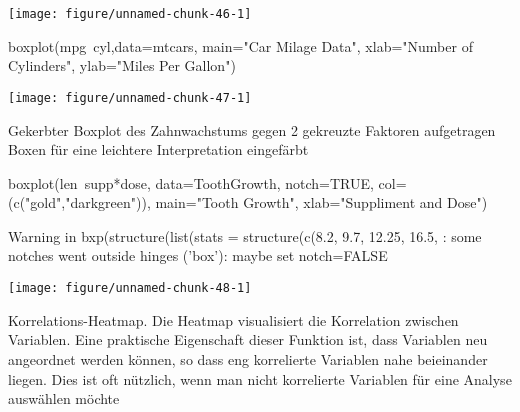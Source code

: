 \documentclass[a4paper,twoside]{tufte-book}\usepackage[]{graphicx}\usepackage[]{color}
\makeatletter
\def\maxwidth{ %
	\ifdim\Gin@nat@width>\linewidth
	\linewidth
	\else
	\Gin@nat@width
	\fi
}
\makeatother
\begin{document}
\begin{Anhang}
\begin{Schunk}
{\centering \texttt{[image: figure/unnamed-chunk-46-1]} 

}

\end{Schunk}



\begin{Schunk}
\begin{Sinput}
boxplot(mpg~cyl,data=mtcars, main="Car Milage Data", 
   xlab="Number of Cylinders", ylab="Miles Per Gallon")
\end{Sinput}


{\centering \texttt{[image: figure/unnamed-chunk-47-1]} 

}

\end{Schunk}

Gekerbter Boxplot des Zahnwachstums gegen 2 gekreuzte Faktoren aufgetragen
Boxen für eine leichtere Interpretation eingefärbt

\begin{Schunk}
\begin{Sinput}
boxplot(len~supp*dose, data=ToothGrowth, notch=TRUE, 
  col=(c("gold","darkgreen")),
  main="Tooth Growth", xlab="Suppliment and Dose")
\end{Sinput}
\begin{Soutput}
Warning in bxp(structure(list(stats = structure(c(8.2, 9.7, 12.25, 16.5, : some notches went outside hinges ('box'): maybe set notch=FALSE
\end{Soutput}


{\centering \texttt{[image: figure/unnamed-chunk-48-1]} 

}

\end{Schunk}



Korrelations-Heatmap. Die Heatmap visualisiert die Korrelation zwischen Variablen. Eine praktische Eigenschaft dieser Funktion ist, dass Variablen neu angeordnet werden können, so dass eng korrelierte Variablen nahe beieinander liegen. Dies ist oft nützlich, wenn man nicht korrelierte Variablen für eine Analyse auswählen möchte


\end{Anhang}
\end{document}
